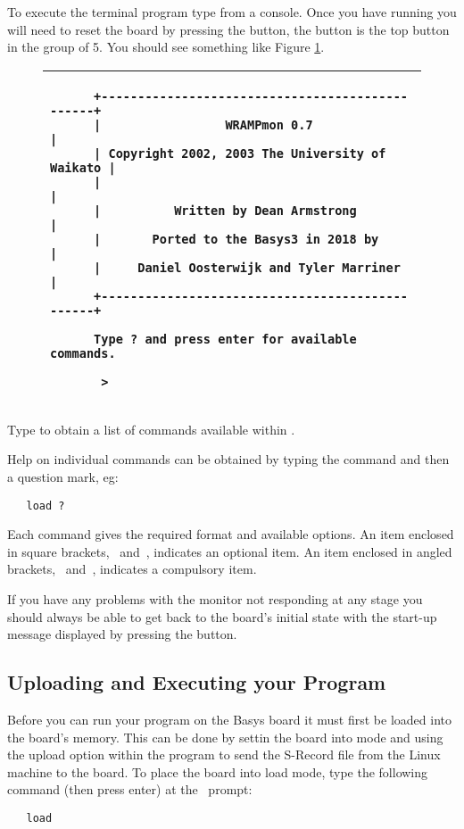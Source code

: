 To execute the terminal program type  from a console.
Once you have  running you will need to reset the
board by pressing the  button, the  button 
is the top button in the group of 5. 
You should see something like Figure \ref{wrampmon}.

\begin{figure}[h]
\begin{center}
\begin{tabular}{|p{15cm}|}
\hline
\begin{verbatim}
      +------------------------------------------------+
      |                 WRAMPmon 0.7                   |
      | Copyright 2002, 2003 The University of Waikato |
      |                                                |
      |          Written by Dean Armstrong             |
      |       Ported to the Basys3 in 2018 by          |
      |     Daniel Oosterwijk and Tyler Marriner       |
      +------------------------------------------------+
      
      Type ? and press enter for available commands.
      
       > 
\end{verbatim}
\\
\hline
\end{tabular}
\end{center}

\caption{\WRAMPmon}
\label{wrampmon}
\end{figure}

Type  to obtain a list of commands available within \WRAMPmon.

Help on individual commands can be obtained by typing the command and then a 
question mark, eg:
\begin{verbatim}
   load ?
\end{verbatim}

Each command gives the required format and available options.
An item enclosed in square brackets, \src{[}~and~\src{]},
indicates an optional item. An item enclosed in angled brackets, 
\src{<}~and~\src{>}, indicates a compulsory item.

If you have any problems with the monitor not responding at any stage you 
should always be able to get back to the board's initial state with the
start-up message displayed by pressing the  button.

\subsection{Uploading and Executing your Program}
Before you can run your program on the Basys board it must first be loaded
into the board's memory. This can be done by settin the board into 
mode and using the upload option within the  program to send
the S-Record file from the Linux machine to the board. To place the board
into load mode, type the following command (then press enter) at the
\WRAMPmon\ prompt:
\begin{verbatim}
   load
\end{verbatim}

